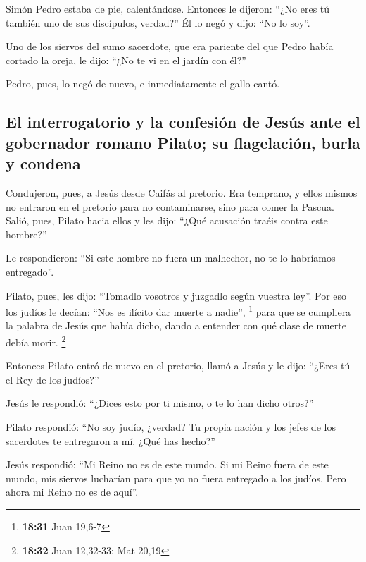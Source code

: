 \begin{paracol}{2}
 Simón Pedro estaba de pie, calentándose. Entonces le
dijeron: ``¿No eres tú también uno de sus discípulos, verdad?'' Él lo
negó y dijo: ``No lo soy''.

 Uno de los siervos del sumo sacerdote, que era pariente
del que Pedro había cortado la oreja, le dijo: ``¿No te vi en el jardín
con él?''

 Pedro, pues, lo negó de nuevo, e inmediatamente el gallo
cantó.

\hypertarget{el-interrogatorio-y-la-confesiuxf3n-de-jesuxfas-ante-el-gobernador-romano-pilato-su-flagelaciuxf3n-burla-y-condena}{%
\subsection{El interrogatorio y la confesión de Jesús ante el gobernador
romano Pilato; su flagelación, burla y
condena}\label{el-interrogatorio-y-la-confesiuxf3n-de-jesuxfas-ante-el-gobernador-romano-pilato-su-flagelaciuxf3n-burla-y-condena}}

 Condujeron, pues, a Jesús desde Caifás al pretorio. Era
temprano, y ellos mismos no entraron en el pretorio para no
contaminarse, sino para comer la Pascua.  Salió, pues,
Pilato hacia ellos y les dijo: ``¿Qué acusación traéis contra este
hombre?''

 Le respondieron: ``Si este hombre no fuera un malhechor,
no te lo habríamos entregado''.

 Pilato, pues, les dijo: ``Tomadlo vosotros y juzgadlo
según vuestra ley''. Por eso los judíos le decían: ``Nos es ilícito dar
muerte a nadie'', \footnote{\textbf{18:31} Juan 19,6-7} 
para que se cumpliera la palabra de Jesús que había dicho, dando a
entender con qué clase de muerte debía morir. \footnote{\textbf{18:32}
  Juan 12,32-33; Mat 20,19}

 Entonces Pilato entró de nuevo en el pretorio, llamó a
Jesús y le dijo: ``¿Eres tú el Rey de los judíos?''

 Jesús le respondió: ``¿Dices esto por ti mismo, o te lo
han dicho otros?''

 Pilato respondió: ``No soy judío, ¿verdad? Tu propia
nación y los jefes de los sacerdotes te entregaron a mí. ¿Qué has
hecho?''

 Jesús respondió: ``Mi Reino no es de este mundo. Si mi
Reino fuera de este mundo, mis siervos lucharían para que yo no fuera
entregado a los judíos. Pero ahora mi Reino no es de aquí''.


\end{paracol}
